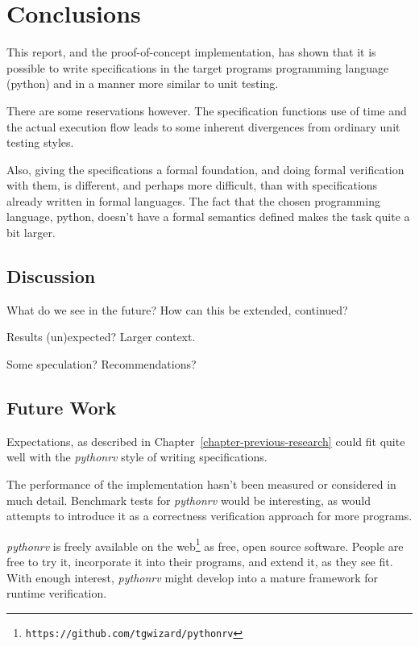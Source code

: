 \documentclass[a4paper,11pt]{kth-mag}
\begin{document}
\pagestyle{newchap}
\chapter{Conclusions} \label{chapter-conclusions}

This report, and the proof-of-concept implementation, has shown that it is
possible to write specifications in the target programs programming language
(python) and in a manner more similar to unit testing.

There are some reservations however. The specification functions use of time
and the actual execution flow leads to some inherent divergences from ordinary
unit testing styles.

Also, giving the specifications a formal foundation, and doing formal
verification with them, is different, and perhaps more difficult, than with
specifications already written in formal languages. The fact that the chosen
programming language, python, doesn't have a formal semantics defined makes the
task quite a bit larger.

\section{Discussion}

What do we see in the future? How can this be extended, continued?

Results (un)expected? Larger context.

Some speculation? Recommendations?

\section{Future Work}

Expectations, as described in Chapter~\ref{chapter-previous-research} could fit
quite well with the \textit{pythonrv} style of writing specifications.

The performance of the implementation hasn't been measured or considered in
much detail. Benchmark tests for \textit{pythonrv} would be interesting, as
would attempts to introduce it as a correctness verification approach for more
programs.

\textit{pythonrv} is freely available on the
web\footnote{\texttt{https://github.com/tgwizard/pythonrv}} as free, open
source software. People are free to try it, incorporate it into their programs,
and extend it, as they see fit. With enough interest, \textit{pythonrv} might
develop into a mature framework for runtime verification.












\end{document}

